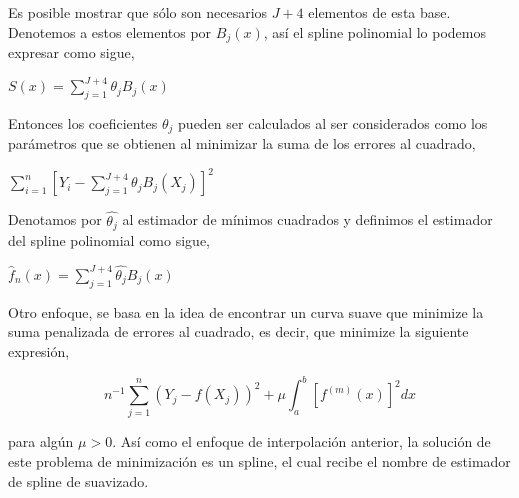 \vspace{0.5cm}

\hspace{0.4cm}Es posible mostrar que s\'olo son necesarios $J+4$ elementos de esta base. Denotemos a estos elementos por $B_{j}(x)$, as\'i el spline polinomial lo podemos expresar como sigue,

\begin{center}

$\displaystyle{S(x)=\sum_{j=1}^{J+4} \theta_{j}B_{j}(x)}$
\end{center}

\vspace{0.5cm}

\hspace{0.4cm}Entonces los coeficientes $\theta_{j}$ pueden ser calculados al ser considerados como los par\'ametros que se obtienen al minimizar la suma de los errores al cuadrado,

 \begin{center}

$\displaystyle{\sum_{i=1}^{n} \left[ Y_{i} - \sum_{j=1}^{J+4} \theta_{j}B_{j}(X_{j})\right]^2}$
\end{center}

\vspace{0.5cm}

\hspace{0.4cm}Denotamos por $\hat{\theta_{j}}$ al estimador de m\'inimos cuadrados y definimos el estimador del spline polinomial como sigue,

 \begin{center}

$\displaystyle{ \hat{f}_{n}(x) = \sum_{j=1}^{J+4} \hat{\theta_{j}}B_{j}(x)}$
\end{center}

\vspace{0.5cm} Otro enfoque, se basa en la idea de encontrar un curva suave que minimize la suma penalizada de errores al cuadrado, es decir, que minimize la siguiente expresi\'on,

\begin{equation}\label{min}
  n^{-1}\sum_{j=1}^{n}(Y_{j}-f(X_{j}))^2+\mu \int_{a}^{b} [f^{(m)} (x)]^2 dx
\end{equation}

\vspace{0.5cm}


\noindent para alg\'un $\mu > 0$. As\'i como el enfoque de interpolaci\'on anterior, la soluci\'on de este problema de minimizaci\'on es un spline, el cual recibe el nombre de estimador de spline de suavizado.

